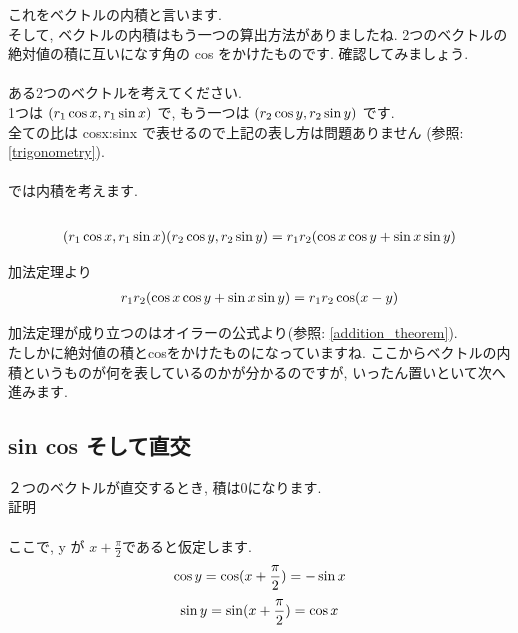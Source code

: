 \documentclass[11pt,a4paper]{jreport}
\begin{document}
これをベクトルの内積と言います.\\
そして, ベクトルの内積はもう一つの算出方法がありましたね. 2つのベクトルの絶対値の積に互いになす角の cos をかけたものです. 確認してみましょう.\\
\\
ある2つのベクトルを考えてください.\\
1つは $(\mathstrut r_1\cos x , \mathstrut r_1\sin x)$ で, もう一つは 
$(\mathstrut r_2\cos y , \mathstrut r_2\sin y)$ です.
\\
全ての比は cosx:sinx で表せるので上記の表し方は問題ありません (参照: \ref{trigonometry}).\\
\\
では内積を考えます.\\
\\
\begin{eqnarray}
(\mathstrut r_1\cos x, \mathstrut r_1\sin x)(\mathstrut r_2\cos y, \mathstrut r_2\sin y) = \mathstrut r_1\mathstrut r_2(\cos x\cos y + \sin x\sin y)
\end{eqnarray}

加法定理より
\begin{eqnarray}
\mathstrut r_1\mathstrut r_2(\cos x\cos y + \sin x\sin y) = \mathstrut r_1\mathstrut r_2\cos (\mathstrut x- \mathstrut y)
\end{eqnarray}

加法定理が成り立つのはオイラーの公式より(参照: \ref{addition_theorem}).\\
たしかに絶対値の積とcosをかけたものになっていますね. ここからベクトルの内積というものが何を表しているのかが分かるのですが, いったん置いといて次へ進みます.\\

\subsection{sin cos そして直交}
２つのベクトルが直交するとき, 積は0になります.\\
証明\\
\\
ここで, y が $x + \frac{\pi}{2}$であると仮定します.\\
\begin{eqnarray}
\cos y = \cos (\mathstrut x + \frac{\pi}{2}) = -\sin x
\label{eq:costosin}
\end{eqnarray}
\begin{eqnarray}
\sin y = \sin (\mathstrut x + \frac{\pi}{2}) = \cos x
\label{eq:sintocos}
\end{eqnarray}
\end{document}
